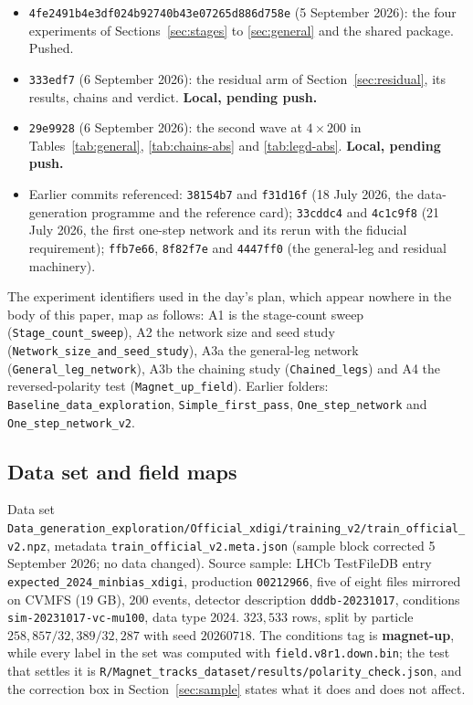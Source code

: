 \documentclass[11pt,a4paper]{article}
\begin{document}
\begin{itemize}
  \item \texttt{4fe2491b4e3df024b92740b43e07265d886d758e} (5 September 2026):
  the four experiments of Sections~\ref{sec:stages} to \ref{sec:general} and the
  shared package. Pushed.
  \item \texttt{333edf7} (6 September 2026): the residual arm of
  Section~\ref{sec:residual}, its results, chains and verdict. \textbf{Local,
  pending push.}
  \item \texttt{29e9928} (6 September 2026): the second wave at $4 \times 200$
  in Tables~\ref{tab:general}, \ref{tab:chains-abs} and \ref{tab:legd-abs}.
  \textbf{Local, pending push.}
  \item Earlier commits referenced: \texttt{38154b7} and \texttt{f31d16f}
  (18 July 2026, the data-generation programme and the reference card);
  \texttt{33cddc4} and \texttt{4c1c9f8} (21 July 2026, the first one-step
  network and its rerun with the fiducial requirement);
  \texttt{ffb7e66}, \texttt{8f82f7e} and \texttt{4447ff0} (the general-leg and
  residual machinery).
\end{itemize}

The experiment identifiers used in the day's plan, which appear nowhere in the
body of this paper, map as follows: A1 is the stage-count sweep
(\texttt{Stage\_count\_sweep}), A2 the network size and seed study
(\texttt{Network\_size\_and\_seed\_study}), A3a the general-leg network
(\texttt{General\_leg\_network}), A3b the chaining study
(\texttt{Chained\_legs}) and A4 the reversed-polarity test
(\texttt{Magnet\_up\_field}). Earlier folders:
\texttt{Baseline\_data\_exploration}, \texttt{Simple\_first\_pass},
\texttt{One\_step\_network} and \texttt{One\_step\_network\_v2}.

\subsection*{Data set and field maps}

Data set
\texttt{Data\_generation\_exploration/}\allowbreak\texttt{Official\_xdigi/training\_v2/}\allowbreak\texttt{train\_official\_v2.npz},
metadata \texttt{train\_official\_v2.meta.json} (sample block corrected
5 September 2026; no data changed). Source sample: LHCb TestFileDB entry
\texttt{expected\_2024\_minbias\_xdigi}, production \texttt{00212966}, five of
eight files mirrored on CVMFS ($19$ GB), $200$ events, detector description
\texttt{dddb-20231017}, conditions \texttt{sim-20231017-vc-mu100}, data type
2024. $323{,}533$ rows, split by particle $258{,}857 / 32{,}389 / 32{,}287$ with
seed $20260718$. The conditions tag is \textbf{magnet-up}, while every label in
the set was computed with \texttt{field.v8r1.down.bin}; the test that settles it
is \texttt{R/Magnet\_tracks\_dataset/results/polarity\_check.json}, and the
correction box in Section~\ref{sec:sample} states what it does and does not
affect.
\end{document}
